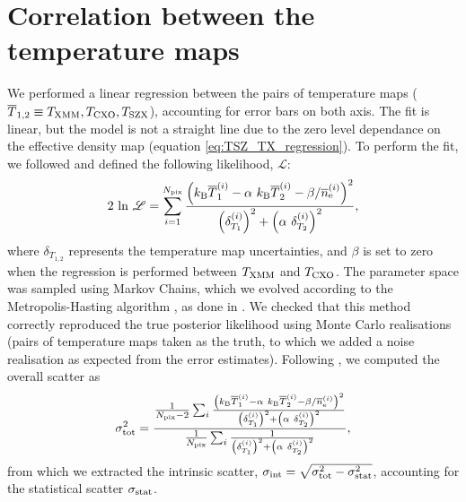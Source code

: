 \documentclass[twocolumn,traditabstract]{aa}
\def\TSZ {T_{\rm SZX}}
\def \TXC {T_{\rm CXO}}
\def \TXX {T_{\rm XMM}}
\begin{document}
\section{Correlation between the temperature maps}\label{append:correlation}
We performed a linear regression between the pairs of temperature maps ($\overline{T}_{1,2} \equiv \TXX, \TXC, \TSZ$), accounting for error bars on both axis. The fit is linear, but the model is not a straight line due to the zero level dependance on the effective density map (equation \ref{eq:TSZ_TX_regression}). To perform the fit, we followed \cite{Orear1982} and defined the following likelihood, $\mathscr{L}$:
\begin{equation}
2 \ {\rm ln} \ \mathscr{L} = \sum_{i=1}^{N_{\rm pix}} \frac{\left(k_{\rm B} \overline{T}^{(i)}_{1} - \alpha \ k_{\rm B} \overline{T}^{(i)}_{2} - {\beta}/{\overline{n}_{\rm e}^{(i)}}\right)^2}{\left(\delta^{(i)}_{T_{1}}\right)^2 + \left(\alpha \ \delta^{(i)}_{T_{2}}\right)^2},
\label{eq:chi2_def}
\end{equation}
where $\delta_{T_{1,2}}$ represents the temperature map uncertainties, and $\beta$ is set to zero when the regression is performed between $\TXX$ and $\TXC$. The parameter space was sampled using Markov Chains, which we evolved according to the Metropolis-Hasting algorithm \citep{Chib1995}, as done in \cite{Adam2015}. We checked that this method correctly reproduced the true posterior likelihood using Monte Carlo realisations (pairs of temperature maps taken as the truth, to which we added a noise realisation as expected from the error estimates). Following \citep{Pratt2009}, we computed the overall scatter as
\begin{equation}
\sigma_{\rm tot}^2 = \frac{\frac{1}{N_{\rm pix} - 2} \sum_i \frac{\left(k_{\rm B} \overline{T}^{(i)}_{1} - \alpha \ k_{\rm B} \overline{T}^{(i)}_{2} - {\beta}/{\overline{n}_{\rm e}^{(i)}}\right)^2}{\left(\delta^{(i)}_{T_{1}}\right)^2 + \left(\alpha \ \delta^{(i)}_{T_{2}}\right)^2}}{\frac{1}{N_{\rm pix}} \sum_i \frac{1}{\left(\delta^{(i)}_{T_{1}}\right)^2 + \left(\alpha \ \delta^{(i)}_{T_{2}}\right)^2}},
\label{eq:scatter_def}
\end{equation}
from which we extracted the intrinsic scatter, $\sigma_{\rm int} = \sqrt{\sigma_{\rm tot}^2 - \sigma_{\rm stat}^2}$, accounting for the statistical scatter $\sigma_{\rm stat}$.
\end{document}
